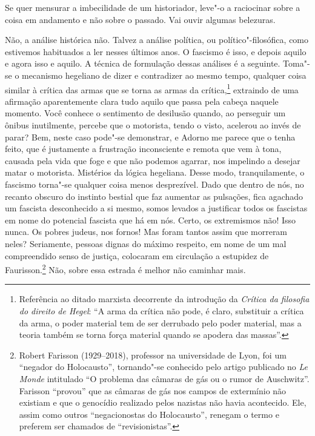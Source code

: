 Se quer mensurar a imbecilidade de um historiador, leve"-o a raciocinar
sobre a coisa em andamento e não sobre o passado. Vai ouvir algumas
belezuras.

Não, a análise histórica não. Talvez a análise política, ou
político"-filosófica, como estivemos habituados a ler nesses últimos
anos. O fascismo é isso, e depois aquilo e agora isso e aquilo. A
técnica de formulação dessas análises é a seguinte. Toma"-se o mecanismo
hegeliano de dizer e contradizer ao mesmo tempo, qualquer coisa similar
à crítica das armas que se torna as armas da crítica,\footnote{Referência ao ditado marxista decorrente da introdução da
  \emph{Crítica da filosofia do direito de Hegel}: ``A arma da crítica
  não pode, é claro, substituir a crítica da arma, o poder material tem
  de ser derrubado pelo poder material, mas a teoria também se torna
  força material quando se apodera das massas''.} extraindo de uma afirmação aparentemente clara tudo
aquilo que passa pela cabeça naquele momento. Você conhece o sentimento
de desilusão quando, ao perseguir um ônibus inutilmente, percebe que o
motorista, tendo o visto, acelerou ao invés de parar? Bem, neste caso
pode"-se demonstrar, e Adorno me parece que o tenha feito, que é
justamente a frustração inconsciente e remota que vem à tona, causada
pela vida que foge e que não podemos agarrar, nos impelindo a desejar
matar o motorista. Mistérios da lógica hegeliana. Desse modo,
tranquilamente, o fascismo torna"-se qualquer coisa menos desprezível.
Dado que dentro de nós, no recanto obscuro do instinto bestial que faz
aumentar as pulsações, fica agachado um fascista desconhecido a si
mesmo, somos levados a justificar todos os fascistas em nome do
potencial fascista que há em nós. Certo, os extremismos não! Isso nunca.
Os pobres judeus, nos fornos! Mas foram tantos assim que morreram neles?
Seriamente, pessoas dignas do máximo respeito, em nome de um mal
compreendido senso de justiça, colocaram em circulação a estupidez de
Faurisson.\footnote{Robert Farisson (1929--2018), professor na universidade de Lyon, foi
  um ``negador do Holocausto'', tornando"-se conhecido pelo artigo
  publicado no \emph{Le Monde} intitulado ``O problema das câmaras de
  gás ou o rumor de Auschwitz''. Farisson ``provou'' que as câmaras de
  gás nos campos de extermínio não existiam e que o genocídio realizado
  pelos nazistas não havia acontecido. Ele, assim como outros
  ``negacionostas do Holocausto'', renegam o termo e preferem ser
  chamados de ``revisionistas''.} Não, sobre essa estrada é melhor não caminhar mais.

